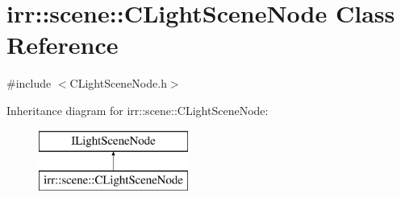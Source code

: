 \hypertarget{classirr_1_1scene_1_1_c_light_scene_node}{\section{irr\-:\-:scene\-:\-:C\-Light\-Scene\-Node Class Reference}
\label{classirr_1_1scene_1_1_c_light_scene_node}
}


{\ttfamily \#include $<$C\-Light\-Scene\-Node.\-h$>$}

Inheritance diagram for irr\-:\-:scene\-:\-:C\-Light\-Scene\-Node\-:\begin{figure}[H]
\begin{center}
\leavevmode
\includegraphics[height=2.000000cm]{classirr_1_1scene_1_1_c_light_scene_node}
\end{center}
\end{figure}
